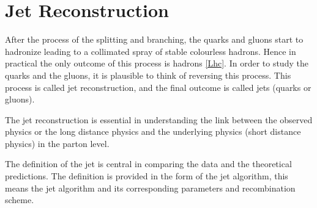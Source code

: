 \chapter{Jet Reconstruction}

After the process of the splitting and branching, the quarks and gluons start to hadronize leading to a collimated spray of stable colourless hadrons. Hence in practical
the only outcome of this process is hadrons \ref{Lhc}. In order to study the quarks and the gluons, it is plausible to think of reversing this process. This process is called jet reconstruction, and the final outcome is called jets (quarks or gluons).     

The jet reconstruction is essential in understanding the link between the observed physics or the long distance physics and the underlying physics (short distance physics) in the parton level.

The definition of the jet is central in comparing the data and the theoretical predictions. The definition is provided in the form of the jet algorithm, this means the jet algorithm and its corresponding parameters and recombination scheme.






